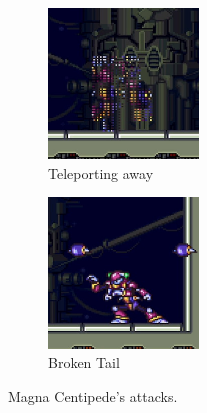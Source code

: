 \begin{figure}[htp]
	\begin{subfigure}{0.4\linewidth}
		\centering
		\includegraphics[height=4cm]{figures/X2/Magna_centipede/Centipede_teleport.png}
		\caption{Teleporting away}
	\end{subfigure}
	\begin{subfigure}{0.4\linewidth}
		\centering
		\includegraphics[height=4cm]{figures/X2/Magna_centipede/Centipede_no_tail.png}
		\caption{Broken Tail}
	\end{subfigure}
	\caption{Magna Centipede's attacks.}	
\end{figure}

